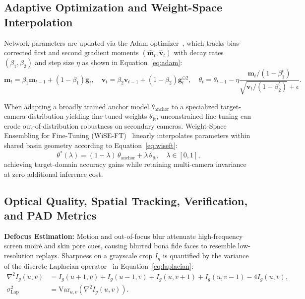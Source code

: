 \subsection{Adaptive Optimization and Weight-Space Interpolation}

Network parameters are updated via the Adam optimizer~\cite{kingma2015adam}, which tracks bias-corrected first and second gradient moments $(\hat{\mathbf{m}}_t, \hat{\mathbf{v}}_t)$ with decay rates $(\beta_1, \beta_2)$ and step size $\eta$ as shown in Equation~\eqref{eq:adam}:
\begin{equation}
\label{eq:adam}
    \mathbf{m}_t = \beta_1 \mathbf{m}_{t-1} + (1 - \beta_1)\mathbf{g}_t, \quad
    \mathbf{v}_t = \beta_2 \mathbf{v}_{t-1} + (1 - \beta_2)\mathbf{g}_t^{\odot 2}, \quad
    \theta_t = \theta_{t-1} - \eta \frac{\mathbf{m}_t / (1 - \beta_1^t)}{\sqrt{\mathbf{v}_t / (1 - \beta_2^t)} + \epsilon}.
\end{equation}

When adapting a broadly trained anchor model $\theta_{\text{anchor}}$ to a specialized target-camera distribution yielding fine-tuned weights $\theta_{\text{ft}}$, unconstrained fine-tuning can erode out-of-distribution robustness on secondary cameras. Weight-Space Ensembling for Fine-Tuning (WiSE-FT)~\cite{wortsman2022robust} linearly interpolates parameters within shared basin geometry according to Equation~\eqref{eq:wiseft}:
\begin{equation}
\label{eq:wiseft}
    \theta^*(\lambda) = (1 - \lambda)\,\theta_{\text{anchor}} + \lambda\,\theta_{\text{ft}}, \quad \lambda \in [0, 1],
\end{equation}
achieving target-domain accuracy gains while retaining multi-camera invariance at zero additional inference cost.

\subsection{Optical Quality, Spatial Tracking, Verification, and PAD Metrics}

\noindent\textbf{Defocus Estimation:} Motion and out-of-focus blur attenuate high-frequency screen moir\'{e} and skin pore cues, causing blurred bona fide faces to resemble low-resolution replays. Sharpness on a grayscale crop $I_g$ is quantified by the variance of the discrete Laplacian operator~\cite{pech2000diatom} in Equation~\eqref{eq:laplacian}:
\begin{equation}
\label{eq:laplacian}
\begin{aligned}
    \nabla^2 I_g(u, v) &= I_g(u+1,v) + I_g(u-1,v) + I_g(u,v+1) + I_g(u,v-1) - 4I_g(u,v), \\
    \sigma^2_{\text{Lap}} &= \text{Var}_{u,v}\!\left(\nabla^2 I_g(u,v)\right).
\end{aligned}
\end{equation}

